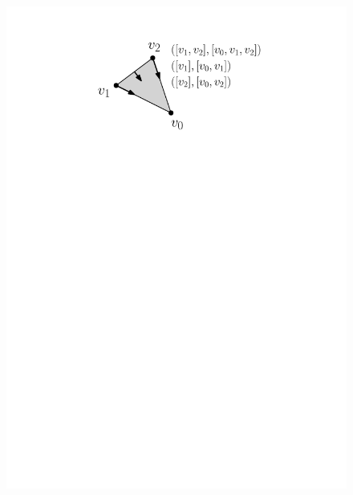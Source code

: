 \documentclass[11pt]{article}
\begin{document}
\begin{figure}
	\includegraphics[scale=0.65]{topology.pdf}

\end{figure}
\end{document}
